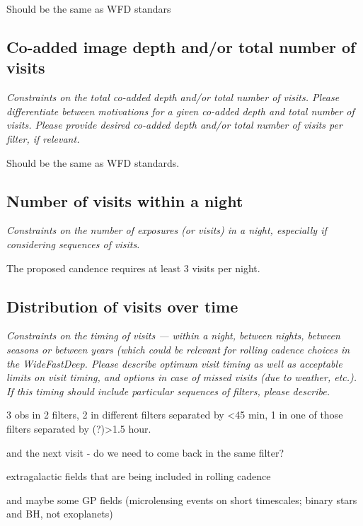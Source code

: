 \documentclass[11pt]{article}
\begin{document}
Should be the same as WFD standars

\subsection{Co-added image depth and/or total number of visits}
\begin{footnotesize}{\it  Constraints on the total co-added depth and/or total number of visits. Please differentiate between motivations for a given co-added depth and total number of visits. Please provide desired co-added depth and/or total number of visits per filter, if relevant.}
\end{footnotesize}

Should be the same as WFD standards.

\subsection{Number of visits within a night}
\begin{footnotesize}{\it Constraints on the number of exposures (or visits) in a night, especially if considering sequences of visits.  }
\end{footnotesize}

The proposed candence requires at least 3 visits per night.

\subsection{Distribution of visits over time}
\begin{footnotesize}{\it Constraints on the timing of visits --- within a night, between nights, between seasons or between years (which could be relevant for rolling cadence choices in the WideFastDeep. Please describe optimum visit timing as well as acceptable limits on visit timing, and options in case of missed visits (due to weather, etc.). If this timing should include particular sequences of filters, please describe.}
\end{footnotesize}

3 obs in 2 filters, 2 in different filters separated by <45 min, 1 in one of those filters separated by (?)>1.5 hour.

and the next visit - do we need to come back in the same filter? 

extragalactic fields that are being included in rolling cadence

and maybe some GP fields (microlensing events on short timescales; binary stars and BH, not exoplanets)
\end{document}
